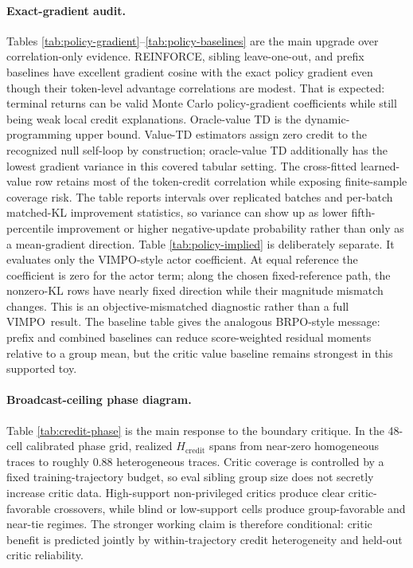 \documentclass[11pt]{article}
\newcommand{\vimpo}{\textsc{VIMPO}}
\newcommand{\brpo}{\textsc{BRPO}}
\begin{document}
\paragraph{Exact-gradient audit.}
Tables \ref{tab:policy-gradient}--\ref{tab:policy-baselines} are the main
upgrade over correlation-only evidence. REINFORCE, sibling leave-one-out, and
prefix baselines have excellent gradient cosine with the exact policy gradient
even though their token-level advantage correlations are modest. That is
expected: terminal returns can be valid Monte Carlo policy-gradient
coefficients while still being weak local credit explanations. Oracle-value TD
is the dynamic-programming upper bound. Value-TD estimators assign zero credit
to the recognized null self-loop by construction; oracle-value TD additionally
has the lowest gradient variance in this covered tabular setting. The cross-fitted
learned-value row retains most of the token-credit correlation while exposing
finite-sample coverage risk. The table reports intervals over replicated
batches and per-batch matched-KL improvement statistics, so variance can show
up as lower fifth-percentile improvement or higher negative-update probability
rather than only as a mean-gradient direction.
Table \ref{tab:policy-implied} is deliberately separate. It evaluates only the
\vimpo-style actor coefficient. At equal reference the coefficient is zero for
the actor term; along the chosen fixed-reference path, the nonzero-KL rows have
nearly fixed direction while their magnitude mismatch changes. This is an
objective-mismatched diagnostic rather than a full \vimpo\ result. The baseline
table gives the analogous \brpo-style message: prefix and combined baselines can
reduce score-weighted residual moments relative to a group mean, but the critic
value baseline remains strongest in this supported toy.

\begin{table}[!htbp]
\centering
\caption{Broadcast-ceiling phase diagnostic over credit heterogeneity,
observability, critic coverage, and reward contrast under matched
train/evaluation dynamics. The ceiling is $\sqrt{1-H_{\mathrm{credit}}}$, the
best possible absolute correlation for a token-invariant broadcast estimator
under the reported token weighting.}
\label{tab:credit-phase}
\scriptsize

\end{table}

\paragraph{Broadcast-ceiling phase diagram.}
Table \ref{tab:credit-phase} is the main response to the boundary critique. In
the 48-cell calibrated phase grid, realized $H_{\mathrm{credit}}$ spans from
near-zero homogeneous traces to roughly 0.88 heterogeneous traces. Critic
coverage is controlled by a fixed training-trajectory budget, so eval sibling
group size does not secretly increase critic data. High-support
non-privileged critics produce clear critic-favorable crossovers, while blind
or low-support cells produce group-favorable and near-tie regimes. The stronger
working claim is therefore conditional: critic benefit is predicted jointly by
within-trajectory credit heterogeneity and held-out critic reliability.
\end{document}
